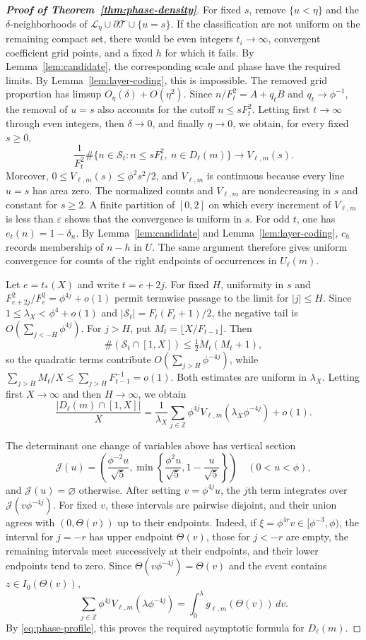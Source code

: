 \documentclass[10pt,a4paper]{amsart}
\newcommand{\Scal}{\mathcal S}
\newcommand{\Tcal}{\mathcal T}
\begin{document}
\begin{proof}[\bf Proof of Theorem~\ref{thm:phase-density}]
For fixed $s$, remove $\{u<\eta\}$ and the $\delta$-neighborhoods of
$\mathcal L_\eta\cup\partial\Tcal\cup\{u=s\}$. If the classification are not uniform on the remaining compact set, there would be even
integers $t_i\to\infty$, convergent coefficient grid points, and a fixed
$h$ for which it fails. By Lemma~\ref{lem:candidate}, the corresponding
scale and phase have the required limits. By
Lemma~\ref{lem:layer-coding}, this is impossible. The removed grid
proportion has limsup $O_\eta(\delta)+O(\eta^2)$. Since
$n/F_t^2=A+q_tB$ and $q_t\to\phi^{-1}$, the removal of $u=s$ also
accounts for the cutoff $n\leq sF_t^2$. Letting first $t\to\infty$ through even integers, then
$\delta\to0$, and finally $\eta\to0$, we obtain, for every fixed
$s\geq0$,
\[
\frac1{F_t^2}\#\{n\in\Scal_t:n\leq sF_t^2,\ 
n\in D_\ell(m)\}\longrightarrow V_{\ell,m}(s).
\]
Moreover, $0\leq V_{\ell,m}(s)\leq\phi^2s^2/2$, and $V_{\ell,m}$ is
continuous because every line $u=s$ has area zero. The normalized
counts and $V_{\ell,m}$ are nondecreasing in $s$ and constant for
$s\geq2$. A finite partition of $[0,2]$ on which every increment of
$V_{\ell,m}$ is less than $\varepsilon$ shows that the convergence is
uniform in $s$. For odd $t$, one has $e_t(n)=1-\delta_n$. By
Lemma~\ref{lem:candidate} and Lemma~\ref{lem:layer-coding}, $c_h$
records membership of $n-h$ in $U$. The same argument therefore gives
uniform convergence for counts of the right endpoints of occurrences
in $U_\ell(m)$.

Let $e=t_*(X)$ and write $t=e+2j$. For fixed $H$, uniformity in $s$ and
$F_{e+2j}^2/F_e^2=\phi^{4j}+o(1)$ permit termwise passage to the limit
for $|j|\leq H$. Since $1\leq\lambda_X<\phi^4+o(1)$ and
$|\Scal_t|=F_t(F_t+1)/2$, the negative tail is
$O(\sum_{j<-H}\phi^{4j})$. For $j>H$, put
$M_t=\lfloor X/F_{t-1}\rfloor$. Then
\[
 \#(\Scal_t\cap[1,X])\leq\tfrac12M_t(M_t+1),
\]
so the quadratic terms contribute $O(\sum_{j>H}\phi^{-4j})$, while
$\sum_{j>H}M_t/X\leq\sum_{j>H}F_{t-1}^{-1}=o(1)$. Both estimates are
uniform in $\lambda_X$. Letting first $X\to\infty$ and then
$H\to\infty$, we obtain
\[
 \frac{|D_\ell(m)\cap[1,X]|}{X}
 =\frac1{\lambda_X}\sum_{j\in\mathbb Z}
 \phi^{4j}V_{\ell,m}(\lambda_X\phi^{-4j})+o(1).
\]

The determinant one change of variables above has vertical section
\[
 \mathcal J(u)=\left(\frac{\phi^{-2}u}{\sqrt5},
 \min\left\{\frac{\phi^2u}{\sqrt5},1-\frac u{\sqrt5}\right\}\right)
 \quad(0<u<\phi),
\]
and $\mathcal J(u)=\varnothing$ otherwise. After setting
$v=\phi^{4j}u$, the $j$th term integrates over
$\mathcal J(v\phi^{-4j})$. For fixed $v$, these intervals are pairwise disjoint, and their union
agrees with $(0,\Theta(v))$ up to their endpoints. Indeed, if
$\xi=\phi^{4r}v\in[\phi^{-3},\phi)$, the interval for $j=-r$ has upper
endpoint $\Theta(v)$, those for $j<-r$ are empty, the remaining
intervals meet successively at their endpoints, and their lower
endpoints tend to zero. Since $\Theta(v\phi^{-4j})=\Theta(v)$ and the
event contains $z\in I_0(\Theta(v))$,
\[
 \sum_{j\in\mathbb Z}\phi^{4j}V_{\ell,m}(\lambda\phi^{-4j})
 =\int_0^\lambda g_{\ell,m}(\Theta(v))\,dv.
\]
By \eqref{eq:phase-profile}, this proves the required asymptotic formula
for $D_\ell(m)$.


\end{proof}
\end{document}
